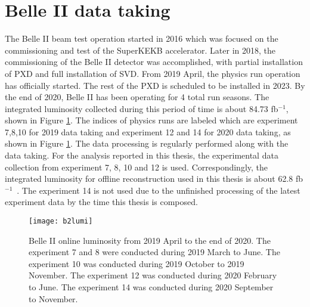 \section{Belle II data taking}
The Belle II beam test operation started in 2016 which was focused on the commissioning and test of the SuperKEKB accelerator. Later in 2018, the commissioning of the Belle II detector was accomplished, with partial installation of PXD and full installation of SVD. From 2019 April, the physics run operation has officially started. The rest of the PXD is scheduled to be installed in 2023. By the end of 2020, Belle II has been operating for 4 total run seasons. The integrated luminosity collected during this period of time is about 84.73 fb$^{-1}$, shown in Figure \ref{fig:b2lumi}. The indices of physics runs are labeled which are experiment 7,8,10 for 2019 data taking and experiment 12 and 14 for 2020 data taking, as shown in Figure \ref{fig:b2lumi}. The data processing is regularly performed along with the data taking. For the analysis reported in this thesis, the experimental data collection from experiment 7, 8, 10 and 12 is used. Correspondingly, the integrated luminosity for offline reconstruction used in this thesis is about 62.8 fb$^{-1}$~\cite{b2onlinelumi}. The experiment 14 is not used due to the unfinished processing of the latest experiment data by the time this thesis is composed. 

\begin{figure}
	\centering
	\texttt{[image: b2lumi]}
	\caption{Belle II online luminosity from 2019 April to the end of 2020. The experiment 7 and 8 were conducted during 2019 March to June. The experiment 10 was conducted during 2019 October to 2019 November. The experiment 12 was conducted during 2020 February to June. The experiment 14 was conducted during 2020 September to November.}
	\label{fig:b2lumi} 
\end{figure}
